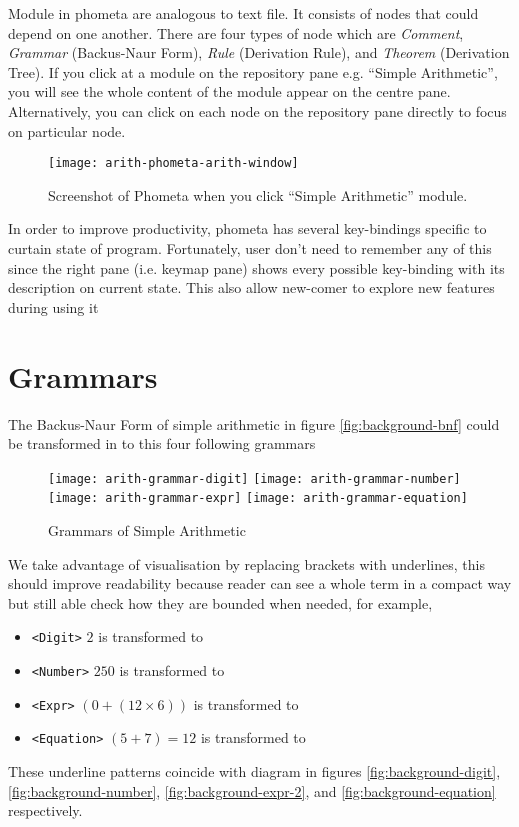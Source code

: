 \documentclass[master.tex]{subfiles}
\begin{document}
Module in phometa are analogous to text file. It consists of nodes that could
depend on one another. There are four types of node which are \emph{Comment},
\emph{Grammar} (Backus-Naur Form), \emph{Rule} (Derivation Rule), and
\emph{Theorem} (Derivation Tree). If you click at a module on the repository
pane e.g. ``Simple Arithmetic'', you will see the whole content of the module
appear on the centre pane. Alternatively, you can click on each node on the
repository pane directly to focus on particular node.

\begin{figure}[H]
    \centering
    \texttt{[image: arith-phometa-arith-window]}
    \caption{Screenshot of Phometa when you click ``Simple Arithmetic'' module.}
\label{fig:arith-phometa-arith-window}
\end{figure}

In order to improve productivity, phometa has several key-bindings specific to
curtain state of program. Fortunately, user don't need to remember any of this
since the right pane (i.e. keymap pane) shows every possible key-binding with
its description on current state. This also allow new-comer to explore new
features during using it

\section{Grammars}

The Backus-Naur Form of simple arithmetic in figure \ref{fig:background-bnf}
could be transformed in to this four following grammars
\begin{figure}[H]
    \centering
\begin{minipage}{0.7\textwidth}
    \texttt{[image: arith-grammar-digit]}
    \texttt{[image: arith-grammar-number]}
    \texttt{[image: arith-grammar-expr]}
    \texttt{[image: arith-grammar-equation]}
\end{minipage}

    \caption{Grammars of Simple Arithmetic}
\label{fig:arith-grammars}
\end{figure}

We take advantage of visualisation by replacing brackets with underlines, this
should improve readability because reader can see a whole term in a compact
way but still able check how they are bounded when needed, for example,
\begin{itemize}
\item \texttt{<Digit>} $2$ is transformed to  
\item \texttt{<Number>} $250$ is transformed to
   
\item \texttt{<Expr>} $(0 + (12 \times 6))$ is transformed to
   
\item \texttt{<Equation>} $(5 + 7) = 12$ is transformed to
   
\end{itemize}
These underline patterns coincide with diagram in figures \ref{fig:background-digit},
\ref{fig:background-number}, \ref{fig:background-expr-2}, and
\ref{fig:background-equation} respectively.
\end{document}
